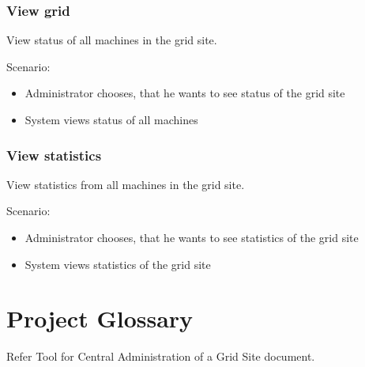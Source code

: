 \documentclass{article}
\begin{document}
\subsubsection{View grid}
View status of all machines in the grid site.

Scenario:
\begin{itemize}
\item{Administrator chooses, that he wants to see status of the grid site}
\item{System views status of all machines}
\end{itemize}

\subsubsection{View statistics}
View statistics from all machines in the grid site.

Scenario:
\begin{itemize}
\item{Administrator chooses, that he wants to see statistics of the grid site}
\item{ System views statistics of the grid site}
\end{itemize}

\section{Project Glossary}

Refer Tool for Central Administration of a Grid Site document.
\end{document}
